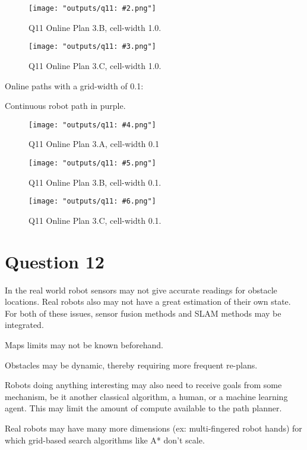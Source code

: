 \documentclass[11pt]{article}
\begin{document}
\begin{figure}[H]
    \centering
    \texttt{[image: "outputs/q11: \#2.png"]}
    \caption{Q11 Online Plan 3.B, cell-width 1.0.}
\end{figure}

\begin{figure}[H]
    \centering
    \texttt{[image: "outputs/q11: \#3.png"]}
    \caption{Q11 Online Plan 3.C, cell-width 1.0.}
\end{figure}


Online paths with a grid-width of 0.1:

Continuous robot path in purple.
\begin{figure}[H]
    \centering
    \texttt{[image: "outputs/q11: \#4.png"]}
    \caption{Q11 Online Plan 3.A, cell-width 0.1}
\end{figure}


\begin{figure}[H]
    \centering
    \texttt{[image: "outputs/q11: \#5.png"]}
    \caption{Q11 Online Plan 3.B, cell-width 0.1.}
\end{figure}


\begin{figure}[H]
    \centering
    \texttt{[image: "outputs/q11: \#6.png"]}
    \caption{Q11 Online Plan 3.C, cell-width 0.1.}
\end{figure}

\section{Question 12}
In the real world robot sensors may not give accurate readings for obstacle locations. Real robots also may not have a great estimation of their own state. For both of these issues, sensor fusion methods and SLAM methods may be integrated.

Maps limits may not be known beforehand.

Obstacles may be dynamic, thereby requiring more frequent re-plans.

Robots doing anything interesting may also need to receive goals from some mechanism, be it another classical algorithm, a human, or a machine learning agent. This may limit the amount of compute available to the path planner.

Real robots may have many more dimensions (ex: multi-fingered robot hands) for which grid-based search algorithms like A* don't scale.
\end{document}
